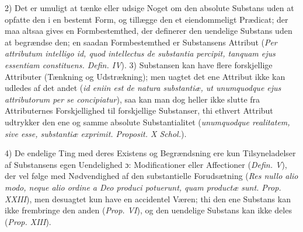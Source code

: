 \documentclass[12pt]{book}
\newcommand{\dsi}{\textup{ɔ:}}
\newcommand{\opage}[1]{\marginnote{\footnotesize\textit{[#1]}}}
\begin{document}
2) Det er umuligt at tænke eller udsige Noget om den absolute Substans uden at opfatte
den i en bestemt Form, og tillægge den et eiendommeligt Prædicat; der maa altsaa gives
en Formbestemthed, der definerer den uendelige Substans uden at begrændse den; en
saadan Formbestemthed er Substansens Attribut (\textit{Per attributum intelligo id,
quod intellectus de substantia percipit, tanquam ejus essentiam constituens.
Defin. IV}).
\opage{164} %
3) Substansen kan have flere forskjellige Attributer (Tænkning og Udstrækning); men
uagtet det ene Attribut ikke kan udledes af det andet (\textit{id eniin est de natura
substantiæ, ut unumquodque ejus attributorum per se concipiatur}), saa kan man dog
heller ikke slutte fra Attributernes Forskjellighed til forskjellige Substanser, thi
ethvert Attribut udtrykker den ene og samme absolute Substantialitet
(\textit{unumquodque realitatem, sive esse, substantiæ exprimit. Proposit. X Schol.}).

4) De endelige Ting med deres Existens og Begrændsning ere kun Tilsyneladelser af
Substansens egen Uendelighed \dsi{} Modificationer eller Affectioner
(\textit{Defin. V}), der vel følge med Nødvendighed af den substantielle Forudsætning
(\textit{Res nullo alio modo, neque alio ordine a Deo produci potuerunt, quam productæ
sunt. Prop. XXIII}), men desuagtet kun have en accidentel Væren; thi den ene Substans
kan ikke frembringe den anden (\textit{Prop. VI}), og den uendelige Substans kan ikke
deles (\textit{Prop. XIII}).
\end{document}
